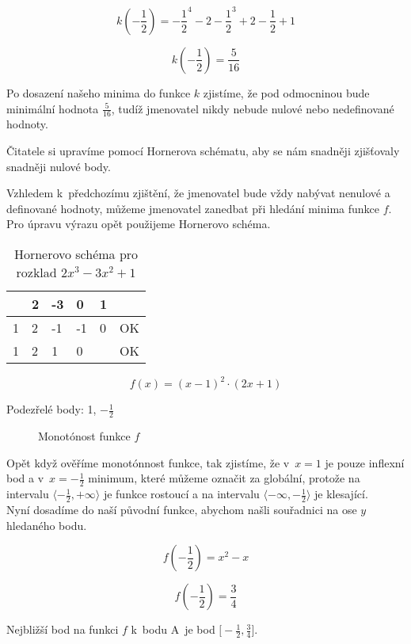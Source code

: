 \begin{displaymath}
k(-\frac{1}{2})=-\frac{1}{2}^4 -2-\frac{1}{2}^3 + 2-\frac{1}{2} + 1
\end{displaymath}

\begin{displaymath}
k(-\frac{1}{2})=\frac{5}{16}
\end{displaymath}

Po dosazení našeho minima do funkce \(k\) zjistíme, že pod odmocninou bude minimální hodnota \(\frac{5}{16}\), tudíž jmenovatel nikdy nebude nulové nebo nedefinované hodnoty.

Čitatele si upravíme pomocí Hornerova schématu, aby se nám snadněji zjišťovaly snadněji nulové body.

Vzhledem k~předchozímu zjištění, že jmenovatel bude vždy nabývat nenulové a definované hodnoty, můžeme jmenovatel zanedbat při hledání minima funkce \(f\).\\

Pro úpravu výrazu opět použijeme Hornerovo schéma.

\begin{table}[!h]
\centering
\begin{tabular}{l||l|l|l|l|l}
	 & 2 & -3 &  0 & 1 &    \\ \hline\hline
   1 & 2 & -1 & -1 & 0 & OK \\ \hline
   1 & 2 &  1 &  0 &   & OK \\
\end{tabular}
\caption{Hornerovo schéma pro rozklad $2x^3 - 3x^2 + 1$}
\end{table}

\begin{displaymath}
f(x)=(x-1)^2\cdot (2x +1)
\end{displaymath}

Podezřelé body: 1, \(-\frac{1}{2}\)

\begin{figure}[H]
	\centering
	
	\caption{Monotónost funkce \(f\)}
\end{figure}

Opět když ověříme monotónnost funkce, tak zjistíme, že v~$x=1$ je pouze inflexní bod a v~$x=-\frac{1}{2}$ minimum, 
které můžeme označit za globální, protože na intervalu \(\langle-\frac{1}{2},+\infty\rangle\) je funkce rostoucí 
a na intervalu \(\langle-\infty,-\frac{1}{2}\rangle\) je klesající.\\
Nyní dosadíme do naší původní funkce, abychom našli souřadnici na ose \(y\) hledaného bodu.

\begin{displaymath}
f(-\frac{1}{2})= x^2 - x
\end{displaymath}

\begin{displaymath}
f(-\frac{1}{2})= \frac{3}{4}
\end{displaymath}

Nejbližší bod na funkci $f$ k~bodu A~je bod $\big[-\frac{1}{2}, \frac{3}{4}\big]$.
